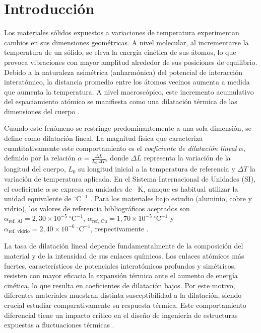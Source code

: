 
\section{Introducción}

Los materiales sólidos expuestos a variaciones de temperatura experimentan cambios en sus dimensiones geométricas. A nivel molecular, al incrementarse la temperatura de un sólido, se eleva la energía cinética de sus átomos, lo que provoca vibraciones con mayor amplitud alrededor de sus posiciones de equilibrio. Debido a la naturaleza asimétrica (anharmónica) del potencial de interacción interatómico, la distancia promedio entre los átomos vecinos aumenta a medida que aumenta la temperatura. A nivel macroscópico, este incremento acumulativo del espaciamiento atómico se manifiesta como una dilatación térmica de las dimensiones del cuerpo \cite{serway}.

Cuando este fenómeno se restringe predominantemente a una sola dimensión, se define como dilatación lineal. La magnitud física que caracteriza cuantitativamente este comportamiento es el \textit{coeficiente de dilatación lineal} $\alpha$, definido por la relación $\alpha = \frac{\Delta L}{L_0\,\Delta T}$, donde $\Delta L$ representa la variación de la longitud del cuerpo, $L_0$ su longitud inicial a la temperatura de referencia y $\Delta T$ la variación de temperatura aplicada. En el Sistema Internacional de Unidades (SI), el coeficiente $\alpha$ se expresa en unidades de \unit{\per\kelvin}, aunque es habitual utilizar la unidad equivalente de $^\circ\text{C}^{-1}$ \cite{halliday}. Para los materiales bajo estudio (aluminio, cobre y vidrio), los valores de referencia bibliográficos aceptados son $\alpha_{\text{ref, Al}} = 2{,}30 \times 10^{-5}\ ^\circ\text{C}^{-1}$, $\alpha_{\text{ref, Cu}} = 1{,}70 \times 10^{-5}\ ^\circ\text{C}^{-1}$ y $\alpha_{\text{ref, vidrio}} = 2{,}40 \times 10^{-6}\ ^\circ\text{C}^{-1}$, respectivamente \cite{serway}.

\label{sec:introduccion} %

La tasa de dilatación lineal depende fundamentalmente de la composición del material y de la intensidad de sus enlaces químicos. Los enlaces atómicos más fuertes, característicos de potenciales interatómicos profundos y simétricos, resisten con mayor eficacia la expansión térmica ante el aumento de energía cinética, lo que resulta en coeficientes de dilatación bajos. Por este motivo, diferentes materiales muestran distinta susceptibilidad a la dilatación, siendo crucial estudiar comparativamente su respuesta térmica. Este comportamiento diferencial tiene un impacto crítico en el diseño de ingeniería de estructuras expuestas a fluctuaciones térmicas \cite{serway}.

